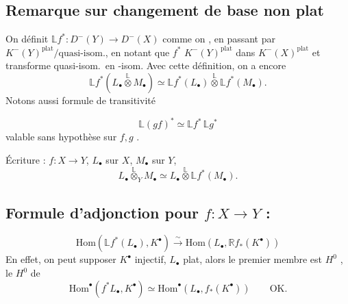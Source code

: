\documentclass[11pt,a4paper]{article}
\begin{document}
\subsection{Remarque sur changement de base non plat}

On définit $\mathbb{L}f^{*} : D^{-}(Y) \to D^{-}(X)$ comme on , en passant par $K^{-}(Y)^{\mathrm{plat}}/\text{quasi-isom.}$, en notant que $f^{*}$ \struck{\ill{}}  $K^{-}(Y)^{\mathrm{plat}}$ dans $K^{-}(X)^{\mathrm{plat}}$ et transforme quasi-isom.\ en -isom. Avec cette définition, on a encore
\[
  \mathbb{L}f^{*}(L_{\bullet} \overset{\mathbb{L}}{\otimes} M_{\bullet})
  \simeq \mathbb{L}f^{*}(L_{\bullet}) \overset{\mathbb{L}}{\otimes} \mathbb{L}f^{*}(M_{\bullet}) .
\]
Notons aussi formule de transitivité

\[
  \mathbb{L}(gf)^{*} \simeq \mathbb{L}f^{*}\, \mathbb{L}g^{*}
\]
valable sans hypothèse sur $f, g$ \ill{}.

Écriture \struck{$\otimes$} : $f : X \to Y$, $L_{\bullet}$ sur $X$, $M_{\bullet}$ sur $Y$,
\[
  L_{\bullet} \overset{\mathbb{L}}{\otimes}_{Y} M_{\bullet}
  \simeq L_{\bullet} \overset{\mathbb{L}}{\otimes} \mathbb{L}f^{*}(M_{\bullet}) .
\]

\subsection{Formule d'adjonction pour $f : X \to Y$ :}


\[
  \mathrm{Hom}(\mathbb{L}f^{*}(L_{\bullet}), K^{\bullet})
  \xrightarrow{\ \sim\ } \mathrm{Hom}(L_{\bullet}, \mathbb{R}f_{*}(K^{\bullet}))
\]
En effet, on peut supposer $K^{\bullet}$ \struck{\ill{}} injectif, $L_{\bullet}$ plat, alors le premier membre est
 $H^{0}$ , le $H^{0}$ de
\[
  \mathrm{Hom}^{\bullet}(f^{*}L_{\bullet}, K^{\bullet}) \simeq \mathrm{Hom}^{\bullet}(L_{\bullet}, f_{*}(K^{\bullet})) \qquad \text{OK.}
\]
\end{document}

